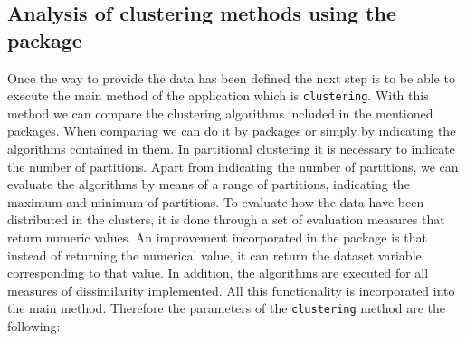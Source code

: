 \subsection*{Analysis of clustering methods using the  package}

Once the way to provide the data has been defined the next step is to be able to execute the main method of the application which is \texttt{clustering}. With this method we can compare the clustering algorithms included in the mentioned packages. When comparing we can do it by packages or simply by indicating the algorithms contained in them. In partitional clustering it is necessary to indicate the number of partitions. Apart from indicating the number of partitions, we can evaluate the algorithms by means of a range of partitions, indicating the maximum and minimum of partitions. To evaluate how the data have been distributed in the clusters, it is done through a set of evaluation measures that return numeric values. An improvement incorporated in the package is that instead of returning the numerical value, it can return the dataset variable corresponding to that value. In addition, the algorithms are executed for all measures of dissimilarity implemented. All this functionality is incorporated into the main method. Therefore the parameters of the \texttt{clustering} method are the following:
